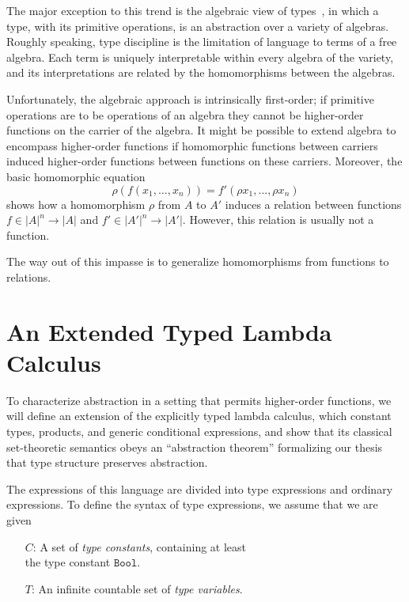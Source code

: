 \documentclass[sigplan,screen,nonacm,balance=false]{acmart}
\theoremstyle{plain}
\newcommand{\Bool}{\mathtt{Bool}}
\begin{document}
The major exception to this trend is the algebraic view of types~\citep{ADTs-GH,ADTs-GTW,ADTs-Kapur}, in which a type, with its primitive operations, is an abstraction over a variety of algebras.
Roughly speaking, type discipline is the limitation of language to terms of a free algebra.
Each term is uniquely interpretable within every algebra of the variety, and its interpretations are related by the homomorphisms between the algebras.

Unfortunately, the algebraic approach is intrinsically first-order; if primitive operations are to be operations of an algebra they cannot be higher-order functions on the carrier of the algebra.
It might be possible to extend algebra to encompass higher-order functions if homomorphic functions between carriers induced higher-order functions between functions on these carriers. Moreover, the basic homomorphic equation
%
\begin{equation*}
  \rho(f(x_1, \dots, x_n)) = f'(\rho x_1, \dots, \rho x_n)
\end{equation*}
%
shows how a homomorphism $\rho$ from $A$ to $A'$ induces a relation between functions $f \in |A|^n \to |A|$ and $f' \in |A'|^n \to |A'|$.
However, this relation is usually not a function.

The way out of this impasse is to generalize homomorphisms from functions to relations.

\section{An Extended Typed Lambda Calculus}

To characterize abstraction in a setting that permits higher-order functions, we will define an extension of the explicitly typed lambda calculus, which constant types, products, and generic conditional expressions, and show that its classical set-theoretic semantics obeys an ``abstraction theorem'' formalizing our thesis that type structure preserves abstraction.

The expressions of this language are divided into type expressions and ordinary expressions.
To define the syntax of type expressions, we assume that we are given

\begin{itemize}[noitemsep,leftmargin=3em]
  \item[$C$:] A set of \emph{type constants}, containing at least \\
    the type constant $\Bool$.
  \item[$T$:] An infinite countable set of \emph{type variables}.
\end{itemize}
\end{document}
